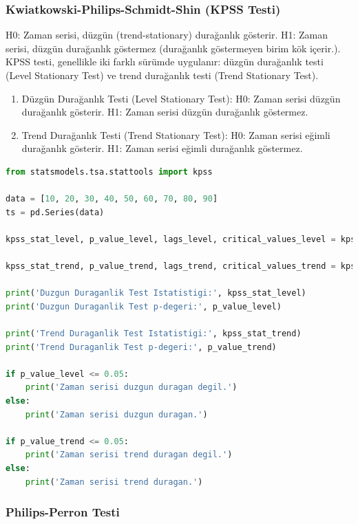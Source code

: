 \subsubsection{Kwiatkowski-Philips-Schmidt-Shin (KPSS Testi)}

H0: Zaman serisi, düzgün (trend-stationary) durağanlık gösterir. H1: Zaman serisi, düzgün durağanlık göstermez (durağanlık göstermeyen birim kök içerir.). KPSS testi, genellikle iki farklı sürümde uygulanır: düzgün durağanlık testi (Level Stationary Test) ve trend durağanlık testi (Trend Stationary Test).

\begin{enumerate}
    \item Düzgün Durağanlık Testi (Level Stationary Test): H0: Zaman serisi düzgün durağanlık gösterir. H1: Zaman serisi düzgün durağanlık göstermez.
    \item Trend Durağanlık Testi (Trend Stationary Test): H0: Zaman serisi eğimli durağanlık gösterir. H1: Zaman serisi eğimli durağanlık göstermez.
\end{enumerate}

\begin{lstlisting}[language=Python]
from statsmodels.tsa.stattools import kpss

data = [10, 20, 30, 40, 50, 60, 70, 80, 90]
ts = pd.Series(data)

kpss_stat_level, p_value_level, lags_level, critical_values_level = kpss(ts, regression='c')

kpss_stat_trend, p_value_trend, lags_trend, critical_values_trend = kpss(ts, regression='ct')

print('Duzgun Duraganlik Test Istatistigi:', kpss_stat_level)
print('Duzgun Duraganlik Test p-degeri:', p_value_level)

print('Trend Duraganlik Test Istatistigi:', kpss_stat_trend)
print('Trend Duraganlik Test p-degeri:', p_value_trend)

if p_value_level <= 0.05:
    print('Zaman serisi duzgun duragan degil.')
else:
    print('Zaman serisi duzgun duragan.')

if p_value_trend <= 0.05:
    print('Zaman serisi trend duragan degil.')
else:
    print('Zaman serisi trend duragan.')
\end{lstlisting}

\newpage

\subsubsection{Philips-Perron Testi}

